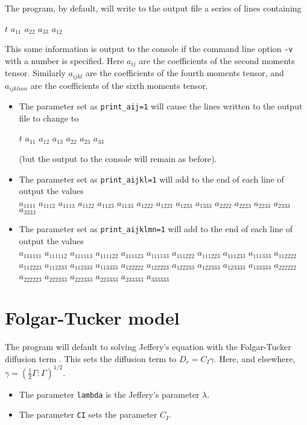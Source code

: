 \documentclass{amsart}
\begin{document}
\noindent
The program, by default, will write to the output file a series of lines containing
\begin{center}$t$ $a_{11}$ $a_{22}$ $a_{33}$ $a_{12}$\end{center}
This same information is output to the console if the command line option {\tt -v} with a number is specified.  Here $a_{ij}$ are the coefficients of the second moments tensor.  Similarly $a_{ijkl}$ are the coefficients of the fourth moments tensor, and $a_{ijklmn}$ are the coefficients of the sixth moments tensor.
\begin{itemize}
\item The parameter set as {\tt print\_aij=1} will cause the lines written to the output file to change to
\begin{center}$t$ $a_{11}$ $a_{12}$ $a_{13}$ $a_{22}$ $a_{23}$ $a_{33}$\end{center}
(but the output to the console will remain as before).
\item The parameter set as {\tt print\_aijkl=1} will add to the end of each line of output the values\\
$a_{1111}$ $a_{1112}$ $a_{1113}$ $a_{1122}$ $a_{1123}$ $a_{1133}$ $a_{1222}$ $a_{1223}$ $a_{1233}$ $a_{1333}$ $a_{2222}$ $a_{2223}$ $a_{2233}$ $a_{2333}$ $a_{3333}$
\item The parameter set as {\tt print\_aijklmn=1} will add to the end of each line of output the values\\
$a_{111111}$ $a_{111112}$ $a_{111113}$ $a_{111122}$ $a_{111123}$ $a_{111133}$ $a_{111222}$ $a_{111223}$ $a_{111233}$ $a_{111333}$ $a_{112222}$ $a_{112223}$ $a_{112233}$ $a_{112333}$ $a_{113333}$ $a_{122222}$ $a_{122223}$ $a_{122233}$ $a_{122333}$ $a_{123333}$ $a_{133333}$ $a_{222222}$ $a_{222223}$ $a_{222233}$ $a_{222333}$ $a_{223333}$ $a_{233333}$ $a_{333333}$
\end{itemize}

\section*{Folgar-Tucker model}

\noindent
The program will default to solving Jeffery's equation with the Folgar-Tucker diffusion term \cite{folgar}.  This sets the diffusion term to $ D_r = C_I \gamma $.
Here, and elsewhere, $\gamma = \left(\frac12\Gamma:\Gamma\right)^{1/2}$.
\begin{itemize}
\item The parameter {\tt lambda} is the Jeffery's parameter $\lambda$.
\item The parameter {\tt CI} sets the parameter $C_I$.
\end{itemize}
\end{document}
